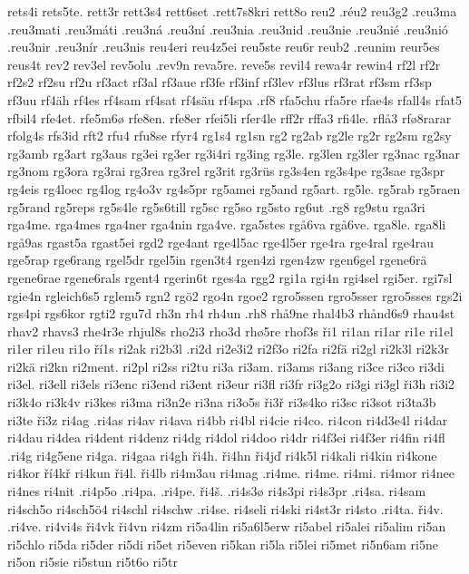 {{rets4i
rets5te.
rett3r
rett3s4
rett6set
.rett7s8kri
rett8o
reu2
.réu2
reu3g2
.reu3ma
.reu3mati
.reu3máti
.reu3ná
.reu3ní
.reu3nia
.reu3nid
.reu3nie
.reu3nié
.reu3nió
.reu3nir
.reu3nír
.reu3nis
reu4eri
reu4z5ei
reu5ste
reu6r
reub2
.reunim
reur5es
reus4t
rev2
rev3el
rev5olu
.rev9n
reva5re.
reve5s
revil4
rewa4r
rewin4
rf2l
rf2r
rf2s2
rf2su
rf2u
rf3act
rf3al
rf3aue
rf3fe
rf3inf
rf3lev
rf3lus
rf3rat
rf3sm
rf3sp
rf3uu
rf4äh
rf4es
rf4sam
rf4sat
rf4säu
rf4spa
.rf8
rfa5chu
rfa5re
rfae4s
rfall4s
rfat5
rfbil4
rfe4et.
rfe5m6ø
rfe8en.
rfe8er
rfei5li
rfer4le
rff2r
rffa3
rfi4le.
rflå3
rfø8rarar
rfolg4s
rfs3id
rft2
rfu4
rfu8se
rfyr4
rg1s4
rg1sn
rg2
rg2ab
rg2le
rg2r
rg2sm
rg2sy
rg3amb
rg3art
rg3aus
rg3ei
rg3er
rg3i4ri
rg3ing
rg3le.
rg3len
rg3ler
rg3nac
rg3nar
rg3nom
rg3ora
rg3rai
rg3rea
rg3rel
rg3rit
rg3rüs
rg3s4en
rg3s4pe
rg3sae
rg3spr
rg4eis
rg4loec
rg4log
rg4o3v
rg4s5pr
rg5amei
rg5and
rg5art.
rg5le.
rg5rab
rg5raen
rg5rand
rg5reps
rg5s4le
rg5s6till
rg5sc
rg5so
rg5sto
rg6ut
.rg8
rg9stu
rga3ri
rga4me.
rga4mes
rga4ner
rga4nin
rga4ve.
rga5stes
rgå6va
rgå6ve.
rga8le.
rga8li
rgå9as
rgast5a
rgast5ei
rgd2
rge4ant
rge4l5ac
rge4l5er
rge4ra
rge4ral
rge4rau
rge5rap
rge6rang
rgel5dr
rgel5in
rgen3t4
rgen4zi
rgen4zw
rgen6gel
rgene6rä
rgene6rae
rgene6rals
rgent4
rgerin6t
rges4a
rgg2
rgi1a
rgi4n
rgi4sel
rgi5er.
rgi7sl
rgie4n
rgleich6s5
rglem5
rgn2
rgö2
rgo4n
rgoe2
rgro5ssen
rgro5sser
rgro5sses
rgs2i
rgs4pi
rgs6kor
rgti2
rgu7d
rh3n
rh4
rh4un
.rh8
rhå9ne
rhal4b3
rhånd6s9
rhau4st
rhav2
rhavs3
rhe4r3e
rhjul8s
rho2i3
rho3d
rhø5re
rhof3s
ři1
ri1an
ri1ar
ri1e
ri1el
ri1er
ri1eu
ri1o
ří1s
ri2ak
ri2b3l
.ri2d
ri2e3i2
ri2f3o
ri2fa
ri2fä
ri2gl
ri2k3l
ri2k3r
ri2kä
ri2kn
ri2ment.
ri2pl
ri2ss
ri2tu
ri3a
ri3am.
ri3ams
ri3ang
ri3ce
ri3co
ri3di
ri3el.
ri3ell
ri3els
ri3enc
ri3end
ri3ent
ri3eur
ri3fl
ri3fr
ri3g2o
ri3gi
ri3gl
ři3h
ri3i2
ri3k4o
ri3k4v
ri3kes
ri3ma
ri3n2e
ri3na
ri3o5s
ři3ř
ri3s4ko
ri3sc
ri3sot
ri3ta3b
ri3te
ři3z
ri4ag
.ri4as
ri4av
ri4ava
ri4bb
ri4bl
ri4cie
ri4co.
ri4con
ri4d3e4l
ri4dar
ri4dau
ri4dea
ri4dent
ri4denz
ri4dg
ri4dol
ri4doo
ri4dr
ri4f3ei
ri4f3er
ri4fin
ri4fl
.ri4g
ri4g5ene
ri4ga.
ri4gaa
ri4gh
ři4h.
ři4hn
ři4jď
ri4k5l
ri4kali
ri4kin
ri4kone
ri4kor
ří4kř
ri4kun
ři4l.
ři4lb
ri4m3au
ri4mag
.ri4me.
ri4me.
ri4mi.
ri4mor
ri4nee
ri4nes
ri4nit
.ri4p5o
.ri4pa.
.ri4pe.
ři4š.
.ri4s3ø
ri4s3pi
ri4s3pr
.ri4sa.
ri4sam
ri4sch5o
ri4sch5ö4
ri4schl
ri4schw
.ri4se.
ri4seli
ri4ski
ri4st3r
ri4sto
.ri4ta.
ři4v.
.ri4ve.
ri4vi4s
ři4vk
ři4vn
ri4zm
ri5a4lin
ri5a6l5erw
ri5abel
ri5alei
ri5alim
ri5an
ri5chlo
ri5da
ri5der
ri5di
ri5et
ri5even
ri5kan
ri5la
ri5lei
ri5met
ri5n6am
ri5ne
ri5on
ri5sie
ri5stun
ri5t6o
ri5tr
}}
